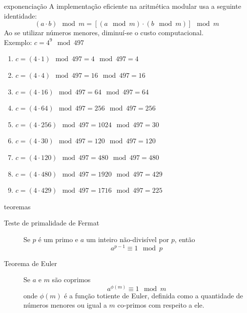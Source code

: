 \documentclass[portuguese,aspectratio=169]{beamer}
\begin{document}
\begin{frame}[allowframebreaks]
\framebreak
\begin{block}{exponenciação}
A implementação eficiente na aritmética modular usa a seguinte identidade:
\begin{equation}
  (a \cdot b) \mod m = [(a \mod m) \cdot (b \mod m)] \mod m
\end{equation}
Ao se utilizar números menores, diminuí-se o custo computacional.\\
Exemplo: $c = 4^{9} \mod 497$
\begin{footnotesize}
\begin{enumerate}
  \setlength{\itemsep}{0pt}
  \item $c = (4 \cdot 1) \mod 497 = 4 \mod 497 = 4$
  \item $c = (4 \cdot 4) \mod 497 = 16 \mod 497 = 16$
  \item $c = (4 \cdot 16) \mod 497 = 64 \mod 497 = 64$
  \item $c = (4 \cdot 64) \mod 497 = 256 \mod 497 = 256$
  \item $c = (4 \cdot 256) \mod 497 = 1024 \mod 497 = 30$
  \item $c = (4 \cdot 30) \mod 497 = 120 \mod 497 = 120$
  \item $c = (4 \cdot 120) \mod 497 = 480 \mod 497 = 480$
  \item $c = (4 \cdot 480) \mod 497 = 1920 \mod 497 = 429$
  \item $c = (4 \cdot 429) \mod 497 = 1716 \mod 497 = 225$
\end{enumerate}
\end{footnotesize}
\end{block}

\framebreak
\begin{block}{teoremas}
\begin{description}
  \item[Teste de primalidade de Fermat] Se $p$ é um primo e $a$ um inteiro não-divisível por $p$, então 
    \begin{equation}
      a^{p-1} \equiv 1 \mod p
    \end{equation}
  \item[Teorema de Euler] Se $a$ e $m$ são coprimos
    \begin{equation}
      a^{\phi(m)} \equiv 1 \mod m
    \end{equation}
    onde $\phi(m)$ é a função totiente de Euler, definida como a quantidade de números menores ou igual a $m$ co-primos com respeito a ele.
\end{description}
\end{block}


\end{frame}
\end{document}
